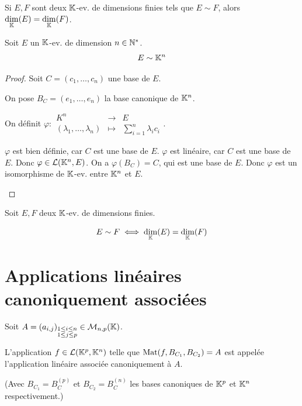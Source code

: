 \documentclass[12pt, a4paper]{report}
\begin{document}
\begin{remark}
    Si $E,F$ sont deux $\mathbb{K}$-ev. de dimensions finies tels que $E \sim F$, alors $\underset{\mathbb{K}}\dim(E) = \underset{\mathbb{K}}\dim(F)$.
\end{remark}

\begin{property}
    Soit $E$ un $\mathbb{K}$-ev. de dimension $n \in \mathbb{N}^*$.
    $$E \sim \mathbb{K}^n$$
\end{property}

\begin{proof}
    Soit $C = (c_1,\dots,c_n)$ une base de $E$.

    On pose $B_C = (e_1,\dots,e_n)$ la base canonique de $\mathbb{K}^n$.

    On définit $\varphi : \begin{matrix} K^n &\to &E \\ (\lambda_1,\dots,\lambda_n) &\mapsto &\sum_{i=1}^n \lambda_i c_i \end{matrix}$.

    \begin{outline}
        \1 $\varphi$ est bien définie, car $C$ est une base de $E$.
        \1 $\varphi$ est linéaire, car $C$ est une base de $E$.
        \1 Donc $\varphi \in \mathcal L(\mathbb{K}^n,E)$.
        \1 On a $\varphi(B_C) = C$, qui est une base de $E$.
        \1 Donc $\varphi$ est un isomorphisme de $\mathbb{K}$-ev. entre $\mathbb{K}^n$ et $E$.
    \end{outline}
\end{proof}

\begin{consequence}
    Soit $E,F$ deux $\mathbb{K}$-ev. de dimensions finies.

    $$E \sim F \iff \underset{\mathbb{K}}\dim(E) = \underset{\mathbb{K}}\dim(F)$$
\end{consequence}

\section{Applications linéaires canoniquement associées}

\begin{definition}
    Soit $A = (a_{i,j})_{\substack{1 \le i \le n \\ 1 \le j \le p}} \in \mathcal M_{n,p}(\mathbb{K})$.

    L'application $f \in \mathcal L(\mathbb{K}^p,\mathbb{K}^n)$ telle que $\mathrm{Mat}(f,B_{C_1},B_{C_2}) = A$ est appelée l'application linéaire associée canoniquement à $A$.

    (Avec $B_{C_1}=B_C^{(p)}$ et $B_{C_2}=B_C^{(n)}$ les bases canoniques de $\mathbb{K}^p$ et $\mathbb{K}^n$ respectivement.)
\end{definition}
\end{document}
